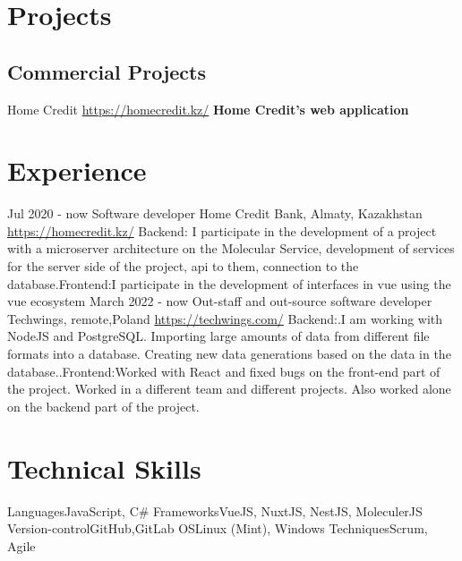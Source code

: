 \documentclass[11pt,a4paper]{moderncv}
\begin{document}
\maketitle

\section{Projects}
  \subsection{Commercial Projects}
  \cvline
    {Home Credit}
    {\url{https://homecredit.kz/}\newline{}
    \textbf{Home Credit's web application}\newline{}
    }
\section{Experience}
\cventry
  {Jul 2020 - now}
  {Software developer}
  {Home Credit Bank, Almaty, Kazakhstan}
  {\newline{}\url{https://homecredit.kz/}}{}
  {Backend: I participate in the development of a project with a microserver architecture on the Molecular  Service,  development of services for the server side of the project, api to them, connection to the    database.\newline Frontend:I participate in the development of interfaces in vue using the vue ecosystem}
\cventry
  {March 2022 - now}
  {Out-staff and out-source software developer}
  {Techwings, remote,Poland}
  {\newline{}\url{https://techwings.com/}}{}
  {Backend:.I am working with NodeJS and PostgreSQL. Importing large amounts of data from different file formats into a database. Creating new data generations based on the data in the database..\newline Frontend:Worked with React and fixed bugs on the front-end part of the project.
  \newline Worked in a different team and different projects.
  Also worked alone on the backend part of the project.}
  
\section{Technical Skills}
\cvline
  {Languages}{JavaScript, C\#}
\cvline
  {Frameworks}{VueJS, NuxtJS, NestJS, MoleculerJS}
\cvline
  {Version-control}{GitHub,GitLab}
\cvline
  {OS}{Linux (Mint), Windows}
\cvline
  {Techniques}{Scrum, Agile}
\end{document}

